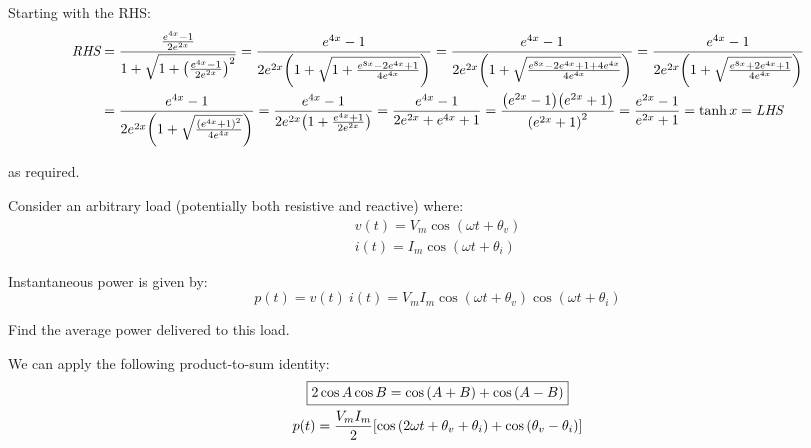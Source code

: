 \documentclass{article}
\begin{document}
Starting with the RHS:
\begin{align*}
    \rhs
    &= \frac{\frac{e^{4x} - 1}{2 e^{2x}}}{1 + \sqrt{1 + \parens*{\frac{e^{4x} - 1}{2 e^{2x}}}^2}}
    = \frac{e^{4x} - 1}{2 e^{2x} \parens*{1 + \sqrt{1 + \frac{e^{8x} - 2 e^{4x} + 1}{4 e^{4x}}}}}
    = \frac{e^{4x} - 1}{2 e^{2x} \parens*{1 + \sqrt{\frac{e^{8x} - 2 e^{4x} + 1 + 4 e^{4x}}{4 e^{4x}}}}}
    = \frac{e^{4x} - 1}{2 e^{2x} \parens*{1 + \sqrt{\frac{e^{8x} + 2 e^{4x} + 1}{4 e^{4x}}}}}
    \\
    &= \frac{e^{4x} - 1}{2 e^{2x} \parens*{1 + \sqrt{\frac{\parens*{e^{4x} + 1}^2}{4 e^{4x}}}}}
    = \frac{e^{4x} - 1}{2 e^{2x} \parens*{1 + \frac{e^{4x} + 1}{2 e^{2x}}}}
    = \frac{e^{4x} - 1}{2 e^{2x} + e^{4x} + 1}
    = \frac{\parens*{e^{2x} - 1} \parens*{e^{2x} + 1}}{\parens*{e^{2x} + 1}^2}
    = \frac{e^{2x} - 1}{e^{2x} + 1}
    = \tanh{x}
    = \lhs
\end{align*}

as required.


\newpage

\begin{QuestionFrame}
    Consider an arbitrary load (potentially both resistive and reactive) where:
    \begin{gather*}
        v(t) = V_m \cos{(\omega t + \theta_v)} \\
        i(t) = I_m \cos{(\omega t + \theta_i)}
    \end{gather*}
    
    Instantaneous power is given by:
    \begin{equation*}
        p(t) = v(t)\ i(t) = V_m I_m \cos{(\omega t + \theta_v)} \cos{(\omega t + \theta_i)}
    \end{equation*}

    Find the average power delivered to this load.
\end{QuestionFrame}

We can apply the following product-to-sum identity:
\begin{gather*}
    \boxed{
        2 \cos{A} \cos{B} = \cos{(A+B)} + \cos{(A-B)}
    } \\
    p(t) = \frac{V_m I_m}{2} \brackets*{\cos{(2 \omega t + \theta_v + \theta_i)} + \cos{(\theta_v - \theta_i)}}
\end{gather*}
\end{document}
